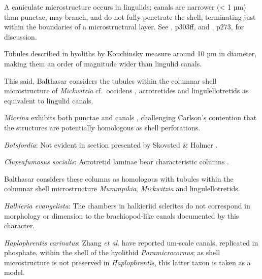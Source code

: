 \documentclass[openany]{book}
\theoremstyle{definition}
\theoremstyle{definition}
\theoremstyle{definition}
\theoremstyle{remark}
\begin{document}
A caniculate microstructure occurs in lingulids; canals are narrower
(\textless{} 1 µm) than punctae, may branch, and do not fully penetrate
the shell, terminating just within the boundaries of a microstructural
layer. See \citet{Williams1997Introduction}, p303ff, and
\citet{Balthasar2008iMummpikia}, p273, for discussion.

Tubules described in hyoliths by Kouchinsky
\citeyearpar{Kouchinsky2000Skeletalmicrostructures} measure around 10 µm
in diameter, making them an order of magnitude wider than lingulid
canals.

This said, Balthasar \citeyearpar{Balthasar2008iMummpikia} considers the
tubules within the columnar shell microstructure of \emph{Mickwitzia}
cf.~occidens \citep[1--3 µm wide,][]{Skovsted2003EarlyCambrian},
acrotretides \citep[1 µm wide,
see][\citet{Zhang2016Epithelialcell}]{Holmer1989MiddleOrdovician} and
lingulellotretids \citep[100 nm wide,][]{Cusack1999Chemicostructural} as
equivalent to lingulid canals.

\emph{Micrina} exhibits both punctae and canals
\citep{Harper2017Brachiopodsorigin}, challenging Carlson's contention
\citep[in][]{Williams2007Supplement} that the structures are potentially
homologous as shell perforations.

\hypertarget{Botsfordia-coding-129}{}
\emph{Botsfordia}: Not evident in section presented by Skovsted \&
Holmer \citeyearpar{Skovsted2003EarlyCambrian}.

\hypertarget{Clupeafumosus_socialis-coding-129}{}
\emph{Clupeafumosus socialis}: Acrotretid laminae bear characteristic
columns \citep[e.g.][]{Zhang2016Epithelialcell}.

Balthasar \citeyearpar{Balthasar2008iMummpikia} considers these columns
as homologous with tubules within the columnar shell microstructure
\emph{Mummpikia}, \emph{Mickwitzia} and lingulellotretids.

\hypertarget{Halkieria_evangelista-coding-129}{}
\emph{Halkieria evangelista}: The chambers in halkieriid sclerites do
not correspond in morphology or dimension to the brachiopod-like canals
documented by this character.

\hypertarget{Haplophrentis_carinatus-coding-129}{}
\emph{Haplophrentis carinatus}: Zhang \emph{et al}.
\citeyearpar{Zhang2018Ahyolithid} have reported um-scale canals,
replicated in phosphate, within the shell of the hyolithid
\emph{Paramicrocornus}; as shell microstructure is not preserved in
\emph{Haplophrentis}, this latter taxon is taken as a model.
\end{document}
